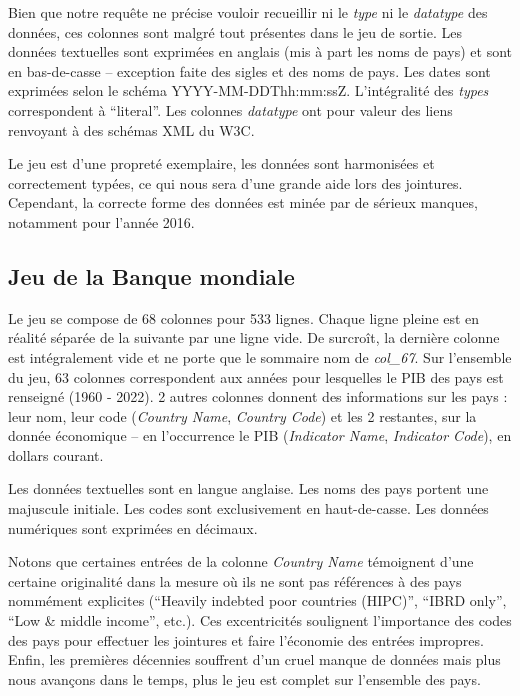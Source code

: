 \documentclass[hidelinks, 12pt]{report}
\begin{document}
\label{nongrata}Bien que notre requête ne précise vouloir recueillir ni le \textit{type} ni le \textit{datatype} des données, ces colonnes sont malgré tout présentes dans le jeu de sortie. Les données textuelles sont exprimées en anglais (mis à part les noms de pays) et sont en bas-de-casse -- exception faite des sigles et des noms de pays. Les dates sont exprimées selon le schéma YYYY-MM-DDThh\!\!:mm\!\!:ssZ. L'intégralité des \textit{types} correspondent à \enquote{literal}. Les colonnes \textit{datatype} ont pour valeur des liens renvoyant à des schémas XML du W3C.

Le jeu est d'une propreté exemplaire, les données sont harmonisées et correctement typées, ce qui nous sera d'une grande aide lors des jointures. Cependant, la correcte forme des données est minée par de sérieux manques, notamment pour l'année 2016.





%





\subsection{Jeu de la Banque mondiale}

Le jeu se compose de 68 colonnes pour 533 lignes. Chaque ligne pleine est en réalité séparée de la suivante par une ligne vide. De surcroît, la dernière colonne est intégralement vide et ne porte que le sommaire nom de \textit{col\_67}. Sur l'ensemble du jeu, 63 colonnes correspondent aux années pour lesquelles le PIB des pays est renseigné (1960 - 2022). 2 autres colonnes donnent des informations sur les pays : leur nom, leur code (\textit{Country Name}, \textit{Country Code}) et les 2 restantes, sur la donnée économique -- en l'occurrence le PIB (\textit{Indicator Name}, \textit{Indicator Code}), en dollars courant. 

Les données textuelles sont en langue anglaise. Les noms des pays portent une majuscule initiale. Les codes sont exclusivement en haut-de-casse. Les données numériques sont exprimées en décimaux.

Notons que certaines entrées de la colonne \textit{Country Name} témoignent d'une certaine originalité dans la mesure où ils ne sont pas références à des pays nommément explicites (\enquote{Heavily indebted poor countries (HIPC)}, \enquote{IBRD only}, \enquote{Low \& middle income}, etc.). Ces excentricités soulignent l'importance des codes des pays pour effectuer les jointures et faire l'économie des entrées impropres. Enfin, les premières décennies souffrent d'un cruel manque de données mais plus nous avançons dans le temps, plus le jeu est complet sur l'ensemble des pays.
\end{document}
